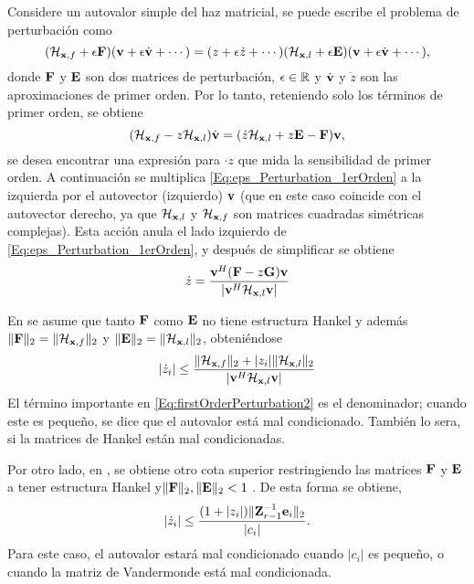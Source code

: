 		Considere un autovalor simple del haz matricial, se puede escribe el problema de perturbación como 
		\begin{equation}
			(\mathcal{H}_{\mathbf{x},f}+\epsilon\mathbf{F})(\mathbf{v} + \epsilon\dot{\mathbf{v}}+\cdots) = (z+\epsilon\dot{z}+\cdots)(\mathcal{H}_{\mathbf{x},l}+\epsilon\mathbf{E})(\mathbf{v} + \epsilon\dot{\mathbf{v}}+\cdots),
			\label{Eq:eps_Perturbation}
		\end{equation}
		donde $\mathbf{F}$ y $\mathbf{E}$ son dos matrices de perturbación, $\epsilon\in\mathbb{R}$ y $\dot{\mathbf{v}}$ y $\dot{z}$ son las aproximaciones de primer orden. Por lo tanto, reteniendo solo los términos de primer orden, se obtiene
		\begin{equation}
				(\mathcal{H}_{\mathbf{x},f}-z\mathcal{H}_{\mathbf{x},l})\dot{\mathbf{v}} = (\dot{z}\mathcal{H}_{\mathbf{x},l} + z\mathbf{E} - \mathbf{F})\mathbf{v}, 
			\label{Eq:eps_Perturbation_1erOrden}
		\end{equation}
		se desea encontrar una expresión para $\cdot{z}$ que mida la sensibilidad de primer orden. A continuación se multiplica \eqref{Eq:eps_Perturbation_1erOrden} a la izquierda por el autovector (izquierdo) $\mathbf{v}$ (que en este caso coincide con el autovector derecho, ya que $\mathcal{H}_{\mathbf{x},l}$ y $\mathcal{H}_{\mathbf{x},f}$ son matrices cuadradas simétricas complejas). Esta acción anula el lado izquierdo de \eqref{Eq:eps_Perturbation_1erOrden}, y después de simplificar se obtiene
		\begin{equation}
			\dot{z} = \frac{\mathbf{v}^H(\mathbf{F} - z\mathbf{G})\mathbf{v}}{|\mathbf{v}^H\mathcal{H}_{\mathbf{x},l}\mathbf{v}|}
			\label{Eq:firstOrderPerturbation}
		\end{equation}
	
		En \cite{Golub1999} se asume que tanto $\mathbf{F}$ como $\mathbf{E}$ no tiene estructura Hankel y además $\|\mathbf{F}\|_2 = \|\mathcal{H}_{\mathbf{x},f}\|_2$ y $\|\mathbf{E}\|_2 = \|\mathcal{H}_{\mathbf{x},l}\|_2$, obteniéndose
		\begin{equation}
			|\dot{z}_i| \le \frac{\|\mathcal{H}_{\mathbf{x},f}\|_2 + |z_i|\|\mathcal{H}_{\mathbf{x},l}\|_2}{|\mathbf{v}^H\mathcal{H}_{\mathbf{x},l}\mathbf{v}|}
			\label{Eq:firstOrderPerturbation2}
		\end{equation}
		El término importante en \eqref{Eq:firstOrderPerturbation2} es el denominador; cuando este es pequeño, se dice que el autovalor está mal condicionado. También lo sera, si la matrices de Hankel están mal condicionadas.
		
		Por otro lado, en \cite{Beckermann2007}, se obtiene otro cota superior restringiendo las matrices $\mathbf{F}$ y $\mathbf{E}$ a tener estructura Hankel y$\|\mathbf{F}\|_2, \|\mathbf{E}\|_2<1$  . De esta forma se obtiene,
		\begin{equation}
			|\dot{z}_i| \le \frac{(1 + |z_i|)\|\mathbf{Z}_{r-1}^{-1}\mathbf{e}_i\|_2}{|c_i|}.
			\label{Eq:firstOrderPerturbation3}
		\end{equation}
		Para este caso, el autovalor estará mal condicionado cuando $|c_i|$ es pequeño, o cuando la matriz de Vandermonde está mal condicionada.
		
